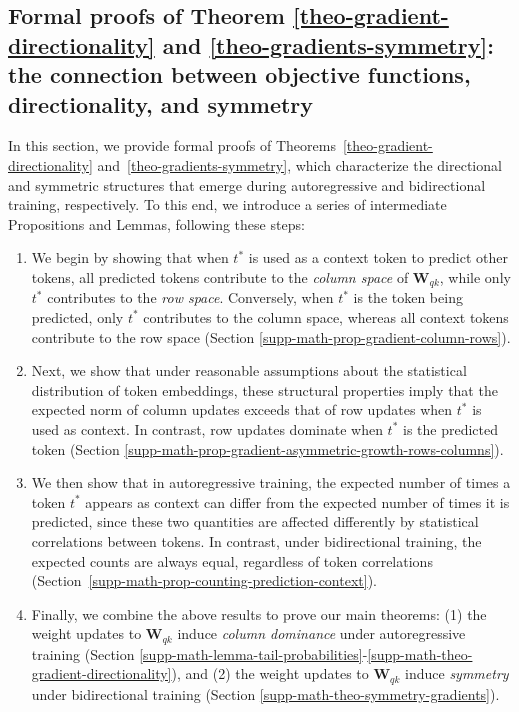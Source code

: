 \subsection{Formal proofs of Theorem \ref{theo-gradient-directionality} and \ref{theo-gradients-symmetry}: the connection between objective functions, directionality, and symmetry}
\label{supp-math-directionality-symmetry}
%
In this section, we provide formal proofs of Theorems~\ref{theo-gradient-directionality} and~\ref{theo-gradients-symmetry}, which characterize the directional and symmetric structures that emerge during autoregressive and bidirectional training, respectively.
%
To this end, we introduce a series of intermediate Propositions and Lemmas, following these steps:

\begin{enumerate}
    \item We begin by showing that when \( t^* \) is used as a context token to predict other tokens, all predicted tokens contribute to the \emph{column space} of \( \bm{W}_{qk} \), while only \( t^* \) contributes to the \emph{row space}.  
    Conversely, when \( t^* \) is the token being predicted, only \( t^* \) contributes to the column space, whereas all context tokens contribute to the row space (Section \ref{supp-math-prop-gradient-column-rows}).
%
    \item Next, we show that under reasonable assumptions about the statistical distribution of token embeddings, these structural properties imply that the expected norm of column updates exceeds that of row updates when \( t^* \) is used as context. In contrast, row updates dominate when \( t^* \) is the predicted token (Section \ref{supp-math-prop-gradient-asymmetric-growth-rows-columns}).
%
    \item We then show that in autoregressive training, the expected number of times a token \( t^* \) appears as context can differ from the expected number of times it is predicted, since these two quantities are affected differently by statistical correlations between tokens.
    In contrast, under bidirectional training, the expected counts are always equal, regardless of token correlations (Section~\ref{supp-math-prop-counting-prediction-context}).
%
    \item Finally, we combine the above results to prove our main theorems:  
    (1) the weight updates to \( \bm{W}_{qk} \) induce \emph{column dominance} under autoregressive training (Section \ref{supp-math-lemma-tail-probabilities}-\ref{supp-math-theo-gradient-directionality}), and  
    (2) the weight updates to \( \bm{W}_{qk} \) induce \emph{symmetry} under bidirectional training (Section \ref{supp-math-theo-symmetry-gradients}).
\end{enumerate}
%


